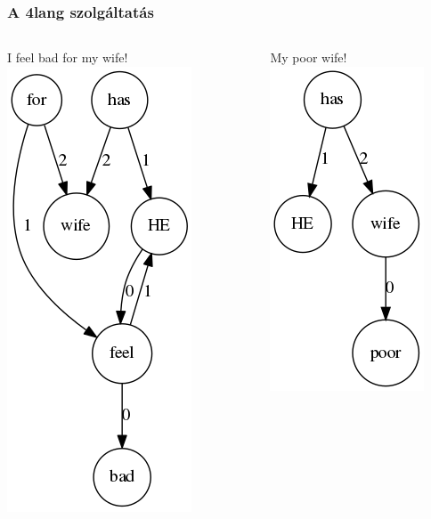 \documentclass[bigger]{beamer}
\begin{document}
\begin{frame}
\frametitle{A 4lang szolgáltatás}
\begin{columns}
	\begin{column}{0.4\textwidth}
		I feel bad for my wife!
		\pause \includegraphics[scale=0.4]{pics/feelbad.png}
	\end{column}
	\begin{column}{0.3\textwidth}
		\pause My poor wife!
		\pause \includegraphics[scale=0.4]{pics/wifepoor.png}
	\end{column}
\end{columns}

\end{frame}
\end{document}
